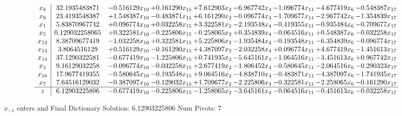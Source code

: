 \documentclass[10pt]{article}
\begin{document}
 \[\begin{array}{c| c c@{\hskip 2pt} c@{\hskip 2pt} c@{\hskip 2pt} c@{\hskip 2pt} c@{\hskip 2pt} c@{\hskip 2pt} c@{\hskip 2pt} }
 x_{8}   &  32.1935483871 & -0.516129 x_{10} & + 0.161290 x_{15} & + 7.612903 x_{2} & -6.967742 x_{4} & -1.096774 x_{11} & -4.677419 x_{6} & -0.548387 x_{17}\\
 x_{9}   &  23.4193548387 & + 1.548387 x_{10} & -0.483871 x_{15} & + 6.161290 x_{2} & -0.096774 x_{4} & -1.709677 x_{11} & -2.967742 x_{6} & -1.354839 x_{17}\\
 x_{1}   &  5.83870967742 & + 0.096774 x_{10} & + 0.032258 x_{15} & + 3.322581 x_{2} & -2.193548 x_{4} & -0.419355 x_{11} & -0.935484 x_{6} & -0.709677 x_{17}\\
 x_{5}   &  0.129032258065 & + 0.322581 x_{10} & -0.225806 x_{15} & -0.258065 x_{2} & + 0.354839 x_{4} & -0.064516 x_{11} & + 0.548387 x_{6} & -0.032258 x_{17}\\
 x_{12}   &  8.38709677419 & -1.032258 x_{10} & + 0.322581 x_{15} & + 5.225806 x_{2} & -1.935484 x_{4} & -0.193548 x_{11} & -6.354839 x_{6} & -0.096774 x_{17}\\
 x_{13}   &  3.8064516129 & + 0.516129 x_{10} & -0.161290 x_{15} & + 4.387097 x_{2} & -2.032258 x_{4} & + 0.096774 x_{11} & + 4.677419 x_{6} & -1.451613 x_{17}\\
 x_{14}   &  37.1290322581 & -0.677419 x_{10} & -1.225806 x_{15} & + 0.741935 x_{2} & -5.645161 x_{4} & -1.064516 x_{11} & -3.451613 x_{6} & + 0.967742 x_{17}\\
 x_{3}   &  9.16129032258 & -0.096774 x_{10} & -0.032258 x_{15} & + 2.677419 x_{2} & -1.806452 x_{4} & -0.580645 x_{11} & -2.064516 x_{6} & -0.290323 x_{17}\\
 x_{16}   &  17.9677419355 & -0.580645 x_{10} & -0.193548 x_{15} & + 9.064516 x_{2} & -4.838710 x_{4} & -0.483871 x_{11} & -4.387097 x_{6} & -1.741935 x_{17}\\
 x_{7}   &  7.64516129032 & -0.387097 x_{10} & -0.129032 x_{15} & + 1.709677 x_{2} & -2.225806 x_{4} & -0.322581 x_{11} & -2.258065 x_{6} & -0.161290 x_{17}\\
\hline
z    &  6.12903225806 & -0.677419 x_{10} & -0.225806 x_{15} & -1.258065 x_{2} & -3.645161 x_{4} & -0.064516 x_{11} & -0.451613 x_{6} & -0.032258 x_{17}\\
\end{array}\]


 $ x_{-1} $ enters and Final Dictionary
Solution:  6.12903225806
Num Pivots:  7
\end{document}
